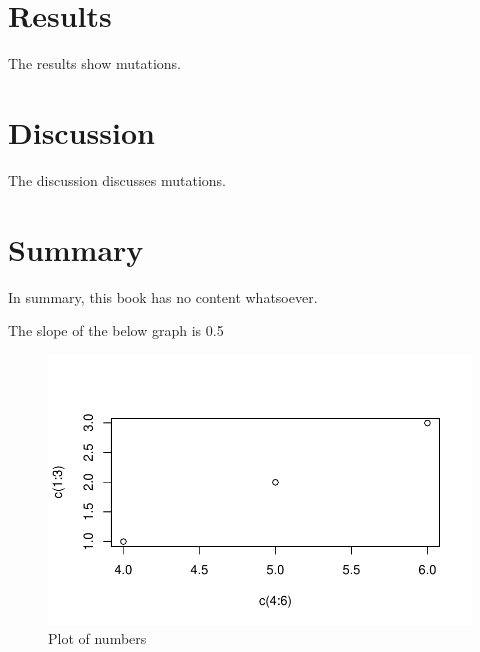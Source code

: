 \documentclass[
  12pt,
  letterpaper,
  DIV=11,
  numbers=noendperiod]{scrreprt}
\begin{document}

\hypertarget{results}{%
\chapter{Results}\label{results}}

The results show mutations.


\hypertarget{discussion}{%
\chapter{Discussion}\label{discussion}}

The discussion discusses mutations.


\hypertarget{summary}{%
\chapter{Summary}\label{summary}}

In summary, this book has no content whatsoever.

The slope of the below graph is 0.5

\begin{figure}

{\centering \includegraphics{summary_files/figure-pdf/fig-plot-1.pdf}

}

\caption{\label{fig-plot}Plot of numbers}

\end{figure}

\end{document}
